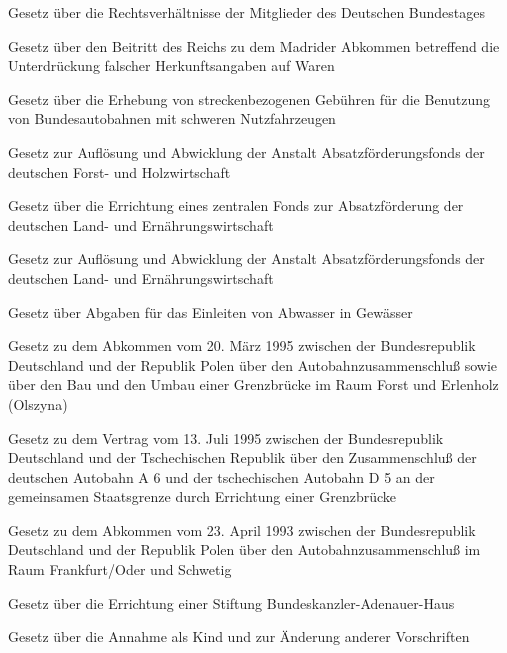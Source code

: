 \item[{AbgG}] Gesetz über die Rechtsverhältnisse der Mitglieder des Deutschen Bundestages

\item[{AbkMadridBeitrG}] Gesetz über den Beitritt des Reichs zu dem Madrider Abkommen betreffend die Unterdrückung falscher Herkunftsangaben auf Waren

\item[{ABMG}] Gesetz über die Erhebung von streckenbezogenen Gebühren für die Benutzung von Bundesautobahnen mit schweren Nutzfahrzeugen

\item[{AbsFondsForstAuflG}] Gesetz zur Auflösung und Abwicklung der Anstalt Absatzförderungsfonds der deutschen Forst- und Holzwirtschaft

\item[{AbsFondsG}] Gesetz über die Errichtung eines zentralen Fonds zur Absatzförderung der deutschen Land- und Ernährungswirtschaft

\item[{AbsFondsLwAuflG}] Gesetz zur Auflösung und Abwicklung der Anstalt Absatzförderungsfonds der deutschen Land- und Ernährungswirtschaft

\item[{AbwAG}] Gesetz über Abgaben für das Einleiten von Abwasser in Gewässer

\item[{ABZusForstAbkPOLG}] Gesetz zu dem Abkommen vom 20. März 1995 zwischen der Bundesrepublik Deutschland und der Republik Polen über den Autobahnzusammenschluß sowie über den Bau und den Umbau einer Grenzbrücke im Raum Forst und Erlenholz (Olszyna)

\item[{ABZusGrBrückVtrCESG}] Gesetz zu dem Vertrag vom 13. Juli 1995 zwischen der Bundesrepublik Deutschland und der Tschechischen Republik über den Zusammenschluß der deutschen Autobahn A 6 und der tschechischen Autobahn D 5 an der gemeinsamen Staatsgrenze durch Errichtung einer Grenzbrücke

\item[{ABZusPolAbkG}] Gesetz zu dem Abkommen vom 23. April 1993 zwischen der Bundesrepublik Deutschland und der Republik Polen über den Autobahnzusammenschluß im Raum Frankfurt/Oder und Schwetig

\item[{AdenauerHStiftG}] Gesetz über die Errichtung einer Stiftung Bundeskanzler-Adenauer-Haus

\item[{AdG}] Gesetz über die Annahme als Kind und zur Änderung anderer Vorschriften

